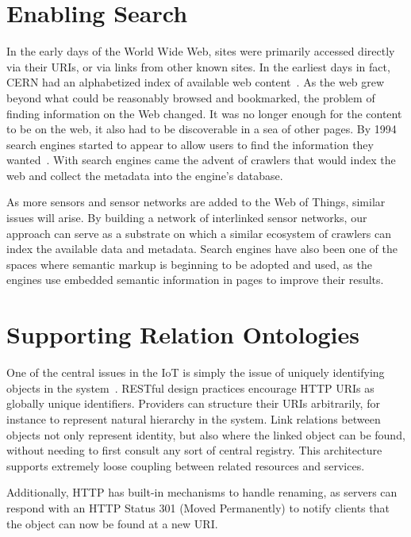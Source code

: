 \documentclass{acm_proc_article-sp}
\begin{document}
\section{Enabling Search}
\label{search}

In the early days of the World Wide Web, sites were primarily accessed directly
via their URIs, or via links from other known sites. In the earliest days in
fact, CERN had an alphabetized index of available web
content~\cite{websearchengines}. As the web grew beyond what could be
reasonably browsed and bookmarked, the problem of finding information on the
Web changed. It was no longer enough for the content to be on the web, it also
had to be discoverable in a sea of other pages. By 1994 search engines started
to appear to allow users to find the information they
wanted~\cite{websearchengines}. With search engines came the advent of crawlers
that would index the web and collect the metadata into the engine's database.

As more sensors and sensor networks are added to the Web of Things, similar
issues will arise. By building a network of interlinked sensor networks, our
approach can serve as a substrate on which a similar ecosystem of crawlers can
index the available data and metadata. Search engines have also been one of the
spaces where semantic markup is beginning to be adopted and used, as the
engines use embedded semantic information in pages to improve their results.

\section{Supporting Relation Ontologies}

One of the central issues in the IoT is simply the issue of uniquely
identifying objects in the system~\cite{iotsurvey}. RESTful design practices
encourage HTTP URIs as globally unique identifiers. Providers can structure
their URIs arbitrarily, for instance to represent natural hierarchy in the
system. Link relations between objects not only represent identity, but also
where the linked object can be found, without needing to first consult any sort
of central registry. This architecture supports extremely loose coupling
between related resources and services.

Additionally, HTTP has built-in mechanisms to handle renaming, as servers can
respond with an HTTP Status 301 (Moved Permanently) to notify clients that the
object can now be found at a new URI.
\end{document}
